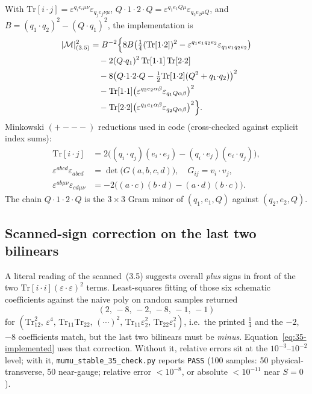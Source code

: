 \documentclass[11pt]{article}
\begin{document}
With
$\mathrm{Tr}[i{\cdot}j]=\varepsilon^{q_i e_i\mu\nu}\varepsilon_{q_j e_j\nu\mu}$,
$Q{\cdot}1{\cdot}2{\cdot}Q=\varepsilon^{q_1 e_1 Q\mu}\varepsilon_{q_2 e_2\mu Q}$,
and $B=(q_1{\cdot}q_2)^2-(Q{\cdot}q_1)^2$, the implementation is
\begin{equation}
\begin{aligned}
  |{\cal M}|^2_{(3.5)}
  &= B^{-2}\Big\{
      8B\big(\tfrac14(\mathrm{Tr}[1{\cdot}2])^2
            -\varepsilon^{q_1 e_1 q_2 e_2}\varepsilon_{q_1 e_1 q_2 e_2}\big) \\
  &\quad
      -2(Q{\cdot}q_1)^2\,\mathrm{Tr}[1{\cdot}1]\,\mathrm{Tr}[2{\cdot}2] \\
  &\quad
      -8\big(Q{\cdot}1{\cdot}2{\cdot}Q
            -\tfrac12\mathrm{Tr}[1{\cdot}2](Q^2+q_1{\cdot}q_2)\big)^2 \\
  &\quad
      -\mathrm{Tr}[1{\cdot}1]
        \big(\varepsilon^{q_2 e_2\alpha\beta}\varepsilon_{q_1 Q\alpha\beta}\big)^2 \\
  &\quad
      -\mathrm{Tr}[2{\cdot}2]
        \big(\varepsilon^{q_1 e_1\alpha\beta}\varepsilon_{q_2 Q\alpha\beta}\big)^2
    \Big\}.
\end{aligned}
\label{eq:35-implemented}
\end{equation}
Minkowski $(+---)$ reductions used in code (cross-checked against explicit
index sums):
\begin{align}
  \mathrm{Tr}[i{\cdot}j]
    &= 2\big((q_i{\cdot}q_j)(e_i{\cdot}e_j)-(q_i{\cdot}e_j)(e_i{\cdot}q_j)\big),
    \label{eq:Tr-id} \\
  \varepsilon^{abcd}\varepsilon_{abcd}
    &= \det\!\big(G(a,b,c,d)\big),
    \quad G_{ij}=v_i{\cdot}v_j,
    \label{eq:eps4-id} \\
  \varepsilon^{ab\mu\nu}\varepsilon_{cd\mu\nu}
    &= -2\big((a{\cdot}c)(b{\cdot}d)-(a{\cdot}d)(b{\cdot}c)\big).
    \label{eq:biline-id}
\end{align}
The chain $Q{\cdot}1{\cdot}2{\cdot}Q$ is the $3\times3$ Gram minor of
$(q_1,e_1,Q)$ against $(q_2,e_2,Q)$.

\subsection{Scanned-sign correction on the last two bilinears}
\label{app:sign-fix}

A literal reading of the scanned~(3.5) suggests overall \emph{plus} signs
in front of the two $\mathrm{Tr}[i{\cdot}i](\varepsilon{\cdot}\varepsilon)^2$
terms. Least-squares fitting of those six schematic coefficients against
the naive poly on random samples returned
\[
  (2,\,-8,\,-2,\,-8,\,-1,\,-1)
\]
for
$(\mathrm{Tr}_{12}^2,\,\varepsilon^4,\,\mathrm{Tr}_{11}\mathrm{Tr}_{22},\,
(\cdots)^2,\,\mathrm{Tr}_{11}\varepsilon_2^2,\,\mathrm{Tr}_{22}\varepsilon_1^2)$,
i.e.\ the printed $\tfrac14$ and the $-2$, $-8$ coefficients match, but
the last two bilinears must be \emph{minus}. Equation~\eqref{eq:35-implemented}
uses that correction. Without it, relative errors sit at the
$10^{-3}$--$10^{-2}$ level; with it,
\texttt{mumu\_stable\_35\_check.py} reports
\texttt{PASS} (100 samples: 50 physical-transverse, 50 near-gauge;
relative error $<10^{-8}$, or absolute $<10^{-11}$ near $S=0$).
\end{document}
